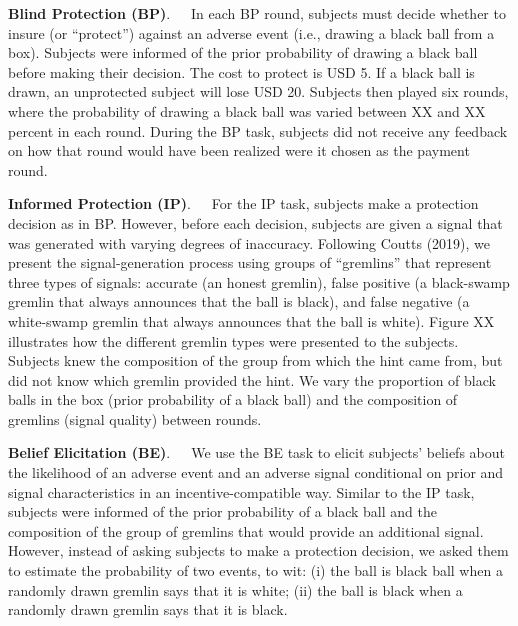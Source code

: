 \documentclass[12pt,a4paper]{article}
\begin{document}
\bigskip
\noindent\textbf{Blind Protection (BP)}.\ \ \ In each BP round, subjects must decide whether to insure (or “protect”) against an adverse event (i.e., drawing a black ball from a box).  Subjects were informed of the prior probability of drawing a black ball before making their decision. The cost to protect is USD 5. If a black ball is drawn, an unprotected subject will lose USD 20. Subjects then played six rounds, where the probability of drawing a black ball was varied between XX and XX percent in each round. During the BP task, subjects did not receive any feedback on how that round would have been realized were it chosen as the payment round.

\bigskip
\noindent\textbf{Informed Protection (IP)}.\ \ \ For the IP task, subjects make a protection decision as in BP. However, before each decision, subjects are given a signal that was generated with varying degrees of inaccuracy. Following Coutts (2019), we present the signal-generation process using groups of ``gremlins'' that represent three types of signals: accurate (an honest gremlin), false positive (a black-swamp gremlin that always announces that the ball is black), and false negative (a white-swamp gremlin that always announces that the ball is white). Figure XX illustrates how the different gremlin types were presented to the subjects. Subjects knew the composition of the group from which the hint came from, but did not know which gremlin provided the hint. We vary the proportion of black balls in the box (prior probability of a black ball) and the composition of gremlins (signal quality) between rounds.  

\bigskip
\noindent\textbf{Belief Elicitation (BE)}.\ \ \ We use the BE task to elicit subjects' beliefs about the likelihood of an adverse event and an adverse signal conditional on prior and signal characteristics in an incentive-compatible way. Similar to the IP task, subjects were informed of the prior probability of a black ball and the composition of the group of gremlins that would provide an additional signal. However, instead of asking subjects to make a protection decision, we asked them to estimate the probability of two events, to wit: (i) the ball is black ball when a randomly drawn gremlin says that it is white; (ii) the ball is black when a randomly drawn gremlin says that it is black.   
\end{document}
